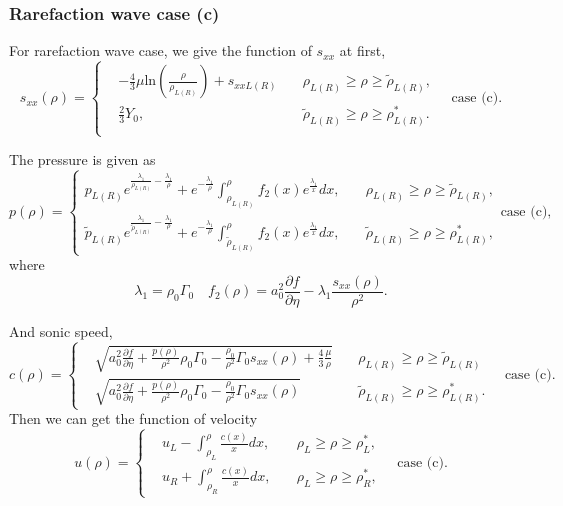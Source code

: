 \documentclass[review]{elsarticle}
\begin{document}
\subsubsection{Rarefaction wave case (c)}
For rarefaction wave case,
we give the function of $s_{xx}$ at first,
\begin{equation}
  s_{xx}(\rho) = \left\{\begin{aligned}
	& -\frac{4}{3}\mu\text{ln}\left(\frac{\rho}{\rho_{L(R)}}\right)+s_{xxL(R)} \quad  & \rho_{L(R)} \ge \rho \ge \tilde{\rho}_{L(R)}  ,\\
	& \frac{2}{3}Y_0, & \tilde{\rho}_{L(R)} \ge \rho \ge \rho_{L(R)}^*.\\
  \end{aligned} \right. \quad \text{case (c)}.
  \end{equation}

The pressure is given as 
\begin{equation}
  p(\rho)= \left\{ \begin{aligned}
	  p_{L(R)}e^{\frac{\lambda_1}{\rho_{L(R)}}-\frac{\lambda_1}{\rho}} +e^{-\frac{\lambda_1}{\rho}}\int_{\rho_{L(R)}}^{\rho} f_2(x) e^{\frac{\lambda_1}{x}}dx,\quad & \rho_{L(R)}\ge \rho \ge \tilde{\rho}_{L(R)},\\
	  \tilde{p}_{L(R)}e^{\frac{\lambda_1}{\tilde{\rho}_{L(R)}}-\frac{\lambda_1}{\rho}} +e^{-\frac{\lambda_1}{\rho}}\int_{\tilde{\rho}_{L(R)}}^{\rho} f_2(x) e^{\frac{\lambda_1}{x}}dx,  \quad & \tilde{\rho}_{L(R)}\ge \rho \ge \rho_{L(R)}^*,
  \end{aligned} \right.
  \text{case (c)},
\end{equation}
where 
\begin{equation}
  \lambda_1 = \rho_0 \Gamma_0 \quad f_2(\rho) = a_0^2\frac{\partial f}{\partial \eta}- \lambda_1\frac{s_{xx}(\rho)}{\rho^2}.
\end{equation}

And sonic speed,
\begin{equation}
  c(\rho) = \left\{ \begin{aligned}
	&  \sqrt{a_0^2 \frac{\partial f}{\partial \eta} + \frac{p(\rho)}{\rho^2}\rho_0\Gamma_0 -\frac{\rho_0}{\rho^2}\Gamma_0 s_{xx}(\rho) +\frac{4}{3}\frac{\mu}{\rho}} \quad  & \rho_{L(R)} \ge \rho \ge \tilde{\rho}_{L(R)}\\
	&	\sqrt{a_0^2 \frac{\partial f}{\partial \eta} + \frac{p(\rho)}{\rho^2}\rho_0\Gamma_0 -\frac{\rho_0}{\rho^2}\Gamma_0 s_{xx}(\rho)}  \quad  &   \tilde{\rho}_{L(R)} \ge \rho \ge \rho_{L(R)}^*.
  \end{aligned}\right. \quad \text{case (c)}.
\end{equation}
Then we can get  the   function of  velocity
\begin{equation}
  u(\rho) =\left\{ \begin{aligned} 
	&u_L - \int_{\rho_L}^{\rho} \frac{c(x)}{x} dx, \quad &  \rho_L\ge \rho\ge \rho_L^* , \\
	&u_R + \int_{\rho_R}^{\rho} \frac{c(x)}{x} dx, \quad &  \rho_L\ge \rho\ge  \rho_R^* , 
	\end{aligned}
  \right. \quad \text{case (c)}.
\end{equation}
\end{document}
